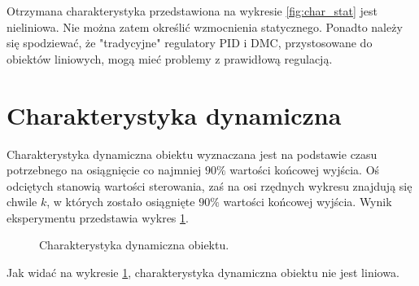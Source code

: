 Otrzymana charakterystyka przedstawiona na wykresie \ref{fig:char_stat} jest nieliniowa. Nie można zatem określić wzmocnienia statycznego. Ponadto należy się spodziewać, że "tradycyjne" regulatory PID i DMC, przystosowane do obiektów liniowych, mogą mieć problemy z prawidłową regulacją.


\section{Charakterystyka dynamiczna}
Charakterystyka dynamiczna obiektu wyznaczana jest na podstawie czasu potrzebnego na osiągnięcie co najmniej $90\%$ wartości końcowej wyjścia. Oś odciętych stanowią wartości sterowania, zaś na osi rzędnych wykresu znajdują się chwile $k$, w których zostało osiągnięte $90\%$ wartości końcowej wyjścia. Wynik eksperymentu przedstawia wykres \ref{fig:char_dyn}.
\begin{figure}[H]
\centering
{}
\caption{Charakterystyka dynamiczna obiektu.}
\label{fig:char_dyn}
\end{figure}

Jak widać na wykresie \ref{fig:char_dyn}, charakterystyka dynamiczna obiektu nie jest liniowa.